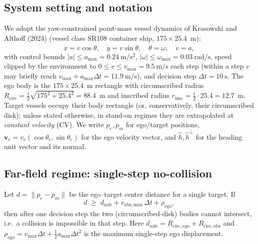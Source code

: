 \subsection{System setting and notation}
\label{sec:provable-setup}

We adopt the yaw-constrained point-mass vessel dynamics of Krasowski and Althoff
(2024) (vessel class SR108 container ship, $175 \times 25.4$~m):
\begin{equation}
  \dot{x}=v\cos\theta,\quad \dot{y}=v\sin\theta,\quad \dot{\theta}=\omega,\quad \dot{v}=a,
  \label{eq:dyn}
\end{equation}
with control bounds $|a|\le a_{\max}=0.24~\mathrm{m/s^2}$,
$|\omega|\le\omega_{\max}=0.03~\mathrm{rad/s}$, speed clipped by the environment to
$0\le v\le v_{\max}=9.5~\mathrm{m/s}$ each step (within a step $v$ may briefly reach
$v_{\max}+a_{\max}\Delta t=11.9~\mathrm{m/s}$), and decision step
$\Delta t=10~\mathrm{s}$. The ego body is the $175\times25.4$~m rectangle with
circumscribed radius $R_{\mathrm{circ}}=\tfrac12\sqrt{175^2+25.4^2}=88.4$~m and
inscribed radius $r_{\mathrm{insc}}=\tfrac12\cdot25.4=12.7$~m. Target vessels occupy
their body rectangle (or, conservatively, their circumscribed disk); unless stated
otherwise, in stand-on regimes they are extrapolated at \emph{constant velocity}
(CV). We write $p_e,p_m$ for ego/target positions,
$\bm{v}_e=v_e(\cos\theta_e,\sin\theta_e)$ for the ego velocity vector, and
$\hat{h},\hat{h}^{\perp}$ for the heading unit vector and its normal.

\subsection{Far-field regime: single-step no-collision}
\label{sec:provable-farfield}

\begin{proposition}
\label{prop:farfield}
Let $d=\lVert p_e-p_m\rVert$ be the ego--target center distance for a single target.
If
\begin{equation}
  d \;\ge\; d_{\mathrm{safe}} + v_{\mathrm{obs,max}}\,\Delta t + \rho_{\mathrm{ego}},
  \label{eq:farfield}
\end{equation}
then after one decision step the two (circumscribed-disk) bodies cannot intersect,
i.e.\ a collision is impossible in that step. Here
$d_{\mathrm{safe}}=R_{\mathrm{circ,ego}}+R_{\mathrm{circ,obs}}$ and
$\rho_{\mathrm{ego}}=v_{\max}\Delta t+\tfrac12 a_{\max}\Delta t^2$ is the maximum
single-step ego displacement.
\end{proposition}

